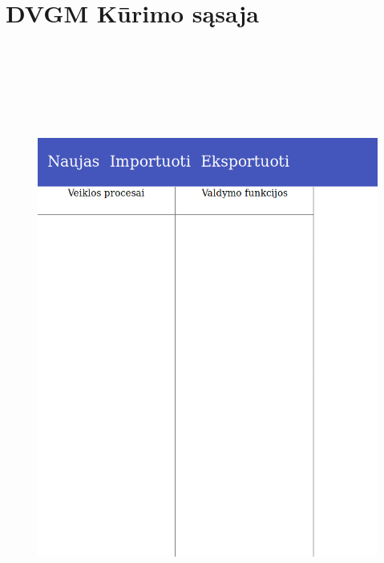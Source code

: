 \documentclass{VUMIFInfBakalaurinis}
\begin{document}
\section{DVGM Kūrimo sąsaja} \label{appendix:run_examples_new_dvcm}
\begin{figure}[H]
    \centering
    \includegraphics[height=20cm]{img/appendix/run_examples/new_dvcm}
\end{figure}
\end{document}
